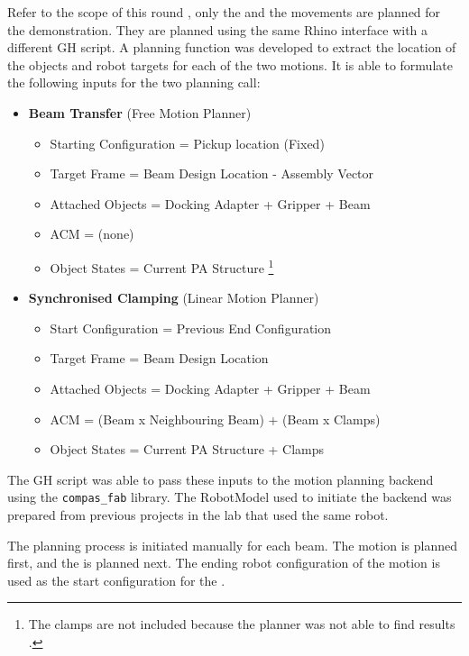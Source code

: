 Refer to the scope of this round , only the  and the  movements are planned for the demonstration. They are planned using the same Rhino interface with a different GH script. A planning function was developed to extract the location of the objects and robot targets for each of the two motions. It is able to formulate the following inputs for the two planning call:

\begin{itemize} [nosep]
    \item \textbf{Beam Transfer}  (Free Motion Planner)
    \begin{itemize}
        \item Starting Configuration = Pickup location (Fixed)
        \item Target Frame = Beam Design Location - Assembly Vector
        \item Attached Objects = Docking Adapter + Gripper + Beam
        \item ACM = (none)
        \item Object States = Current PA Structure%
        \footnote{ The clamps are not included because the planner was not able to find results .}
    \end{itemize}
    \item \textbf{Synchronised Clamping}  (Linear Motion Planner)
    \begin{itemize}
        \item Start Configuration = Previous End Configuration
        \item Target Frame = Beam Design Location
        \item Attached Objects = Docking Adapter + Gripper + Beam
        \item ACM = (Beam x Neighbouring Beam) + (Beam x Clamps)
        \item Object States = Current PA Structure + Clamps
    \end{itemize}
\end{itemize}


The GH script was able to pass these inputs to the motion planning backend using the \verb|compas_fab| library. The RobotModel used to initiate the backend was prepared from previous projects in the lab that used the same robot. 

The planning process is initiated manually for each beam. The  motion is planned first, and the  is planned next. The ending robot configuration of the  motion is used as the start configuration for the .

